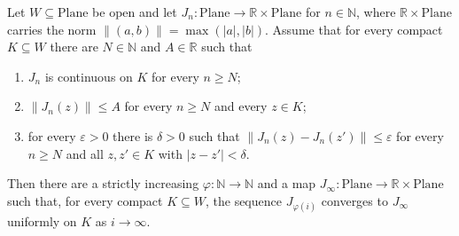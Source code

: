 \begin{lemma}
Let $W\subseteq\mathrm{Plane}$ be open and let
$J_n\colon\mathrm{Plane}\to\mathbb{R}\times\mathrm{Plane}$ for $n\in\mathbb{N}$, where
$\mathbb{R}\times\mathrm{Plane}$ carries the norm
$\lVert(a,b)\rVert=\max(\lvert a\rvert,\lvert b\rvert)$.  Assume that for every compact
$K\subseteq W$ there are $N\in\mathbb{N}$ and $A\in\mathbb{R}$ such that
\begin{enumerate}
\item $J_n$ is continuous on $K$ for every $n\ge N$;
\item $\lVert J_n(z)\rVert\le A$ for every $n\ge N$ and every $z\in K$;
\item for every $\varepsilon>0$ there is $\delta>0$ such that
$\lVert J_n(z)-J_n(z')\rVert\le\varepsilon$ for every $n\ge N$ and all $z,z'\in K$ with
$\lvert z-z'\rvert<\delta$.
\end{enumerate}
Then there are a strictly increasing $\varphi\colon\mathbb{N}\to\mathbb{N}$ and a map
$J_\infty\colon\mathrm{Plane}\to\mathbb{R}\times\mathrm{Plane}$ such that, for every compact
$K\subseteq W$, the sequence $J_{\varphi(i)}$ converges to $J_\infty$ uniformly on $K$ as
$i\to\infty$.
\end{lemma}
